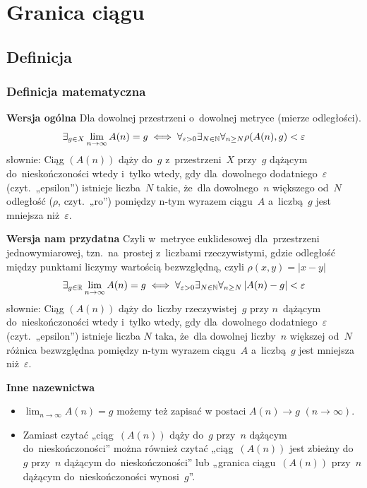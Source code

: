 \section{Granica ciągu}

\subsection{Definicja}

\subsubsection{Definicja matematyczna}

\noindent
\textbf{Wersja ogólna}
\newline
Dla dowolnej przestrzeni o~dowolnej metryce (mierze odległości).
\newline
$$\exists_{g \in X} \lim_{n \to \infty} A(n) = g \iff \forall_{\varepsilon>0} \exists_{N \in \mathbb{N}} \forall_{n \geq N}  \rho(A(n), g) < \varepsilon$$
słownie: Ciąg $(A(n))$ dąży do~$g$ z~przestrzeni~$X$ przy~$g$ dążącym do~nieskończoności wtedy i~tylko wtedy, gdy dla~dowolnego dodatniego~$\varepsilon$ (czyt.~„epsilon”) istnieje liczba~$N$ takie, że~dla dowolnego~$n$ większego od~$N$ odległość ($\rho$, czyt.~„ro”) pomiędzy n-tym wyrazem ciągu~$A$ a~liczbą~$g$ jest mniejsza niż~$\varepsilon$.
\newline

\noindent
\textbf{Wersja nam przydatna}
\newline
Czyli w~metryce euklidesowej dla~przestrzeni jednowymiarowej, tzn.~na~prostej z~liczbami rzeczywistymi, gdzie odległość między punktami liczymy wartością bezwzględną, czyli $\rho(x, y) = \left|x - y\right|$
\newline
$$\exists_{g \in \mathbb{R}} \lim_{n \to \infty} A(n) = g \iff \forall_{\varepsilon>0} \exists_{N \in \mathbb{N}} \forall_{n \geq N} \left|A(n) - g\right| < \varepsilon $$
słownie: Ciąg $(A(n))$ dąży do~liczby rzeczywistej~$g$ przy $n$~dążącym do~nieskończoności wtedy i~tylko wtedy, gdy dla~dowolnego dodatniego~$\varepsilon$ (czyt.~„epsilon”) istnieje liczba $N$ taka, że~dla dowolnej liczby~$n$ większej od~$N$ różnica bezwzględna pomiędzy n-tym wyrazem ciągu~$A$ a~liczbą~$g$ jest mniejsza niż~$\varepsilon$.
\newline

\noindent
\textbf{Inne nazewnictwa}
\begin{itemize}
    \item $\lim_{n \to \infty} A(n) = g$ możemy też zapisać w postaci \newline $A(n) \to g$ $(n \to \infty)$.
    \item Zamiast czytać „ciąg~$(A(n))$ dąży do~$g$ przy~$n$ dążącym do~nieskończoności” można również czytać „ciąg~$(A(n))$ jest zbieżny do~$g$ przy~$n$ dążącym do~nieskończoności” lub „granica ciągu~$(A(n))$ przy~$n$ dążącym do~nieskończoności wynosi~$g$”.
\end{itemize}
\indent

